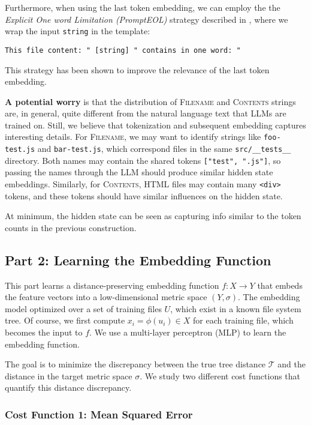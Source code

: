 \documentclass{article}
\begin{document}
Furthermore, when using the last token embedding, we can employ the the \emph{Explicit One word Limitation (PromptEOL)} strategy described in \cite{jiang2023scalingsentenceembeddingslarge}, where we wrap the input \texttt{string} in the template:
\begin{center}
  \texttt{This file content: " [string] " contains in one word: "}
\end{center}
This strategy has been shown to improve the relevance of the last token embedding.

\textbf{A potential worry} is that the distribution of \textsc{Filename} and \textsc{Contents} strings are, in general, quite different from the natural language text that LLMs are trained on. Still, we believe that tokenization and subsequent embedding captures interesting details. For \textsc{Filename}, we may want to identify strings like \texttt{foo-test.js} and \texttt{bar-test.js}, which correspond files in the same \texttt{src/\_\_tests\_\_} directory. Both names may contain the shared tokens \texttt{["test", ".js"]}, so passing the names through the LLM should produce similar hidden state embeddings. Similarly, for \textsc{Contents}, HTML files may contain many \texttt{<div>} tokens, and these tokens should have similar influences on the hidden state.

At minimum, the hidden state can be seen as capturing info similar to the token counts in the previous construction.

\subsection{Part 2: Learning the Embedding Function}

This part learns a distance-preserving embedding function $f: X \to Y$ that embeds the feature vectors into a low-dimensional metric space $(Y, \sigma)$. The embedding model optimized over a set of training files $U$, which exist in a known file system tree. Of course, we first compute $x_i = \phi(u_i) \in X$ for each training file, which becomes the input to $f$.  We use a multi-layer perceptron (MLP) to learn the embedding function.

The goal is to minimize the discrepancy between the true tree distance $\mathcal T$ and the distance in the target metric space $\sigma$. We study two different cost functions that quantify this distance discrepancy.

\subsubsection{Cost Function 1: Mean Squared Error}
\end{document}
